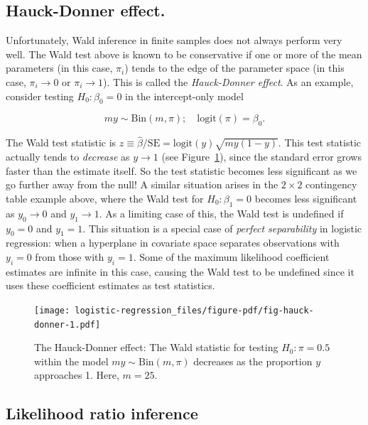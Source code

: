 \documentclass[
  11pt,
  letterpaper,
  oneside]{book}
\theoremstyle{plain}
\theoremstyle{definition}
\theoremstyle{definition}
\theoremstyle{plain}
\theoremstyle{plain}
\theoremstyle{remark}
\begin{document}
\hypertarget{sec-hauck-donner-effect}{%
\subsection{Hauck-Donner effect.}\label{sec-hauck-donner-effect}}

Unfortunately, Wald inference in finite samples does not always perform
very well. The Wald test above is known to be conservative if one or
more of the mean parameters (in this case, \(\pi_i\)) tends to the edge
of the parameter space (in this case, \(\pi_i \rightarrow 0\) or
\(\pi_i \rightarrow 1\)). This is called the \emph{Hauck-Donner effect}.
As an example, consider testing \(H_0: \beta_0 = 0\) in the
intercept-only model

\[
my \sim \text{Bin}(m, \pi); \quad \text{logit}(\pi) = \beta_0.
\]

The Wald test statistic is
\(z \equiv \widehat \beta/\text{SE} = \text{logit}(y)\sqrt{my(1-y)}\).
This test statistic actually tends to \emph{decrease} as
\(y \rightarrow 1\) (see Figure~\ref{fig-hauck-donner}), since the
standard error grows faster than the estimate itself. So the test
statistic becomes less significant as we go further away from the null!
A similar situation arises in the \(2 \times 2\) contingency table
example above, where the Wald test for \(H_0: \beta_1 = 0\) becomes less
significant as \(y_0 \rightarrow 0\) and \(y_1 \rightarrow 1\). As a
limiting case of this, the Wald test is undefined if \(y_0 = 0\) and
\(y_1 = 1\). This situation is a special case of \emph{perfect
separability} in logistic regression: when a hyperplane in covariate
space separates observations with \(y_i = 0\) from those with
\(y_i = 1\). Some of the maximum likelihood coefficient estimates are
infinite in this case, causing the Wald test to be undefined since it
uses these coefficient estimates as test statistics.

\begin{figure}

{\centering \texttt{[image: logistic-regression\_files/figure-pdf/fig-hauck-donner-1.pdf]}

}

\caption{\label{fig-hauck-donner}The Hauck-Donner effect: The Wald
statistic for testing \(H_0: \pi = 0.5\) within the model
\(my \sim \text{Bin}(m, \pi)\) decreases as the proportion \(y\)
approaches 1. Here, \(m = 25\).}

\end{figure}

\hypertarget{sec-likelihood-ratio-inference}{%
\subsection{Likelihood ratio
inference}\label{sec-likelihood-ratio-inference}}
\end{document}
